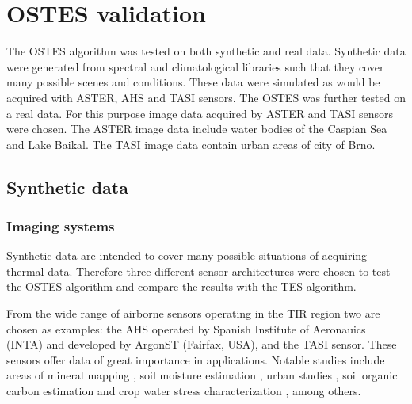\chapter{OSTES validation}
\label{chap:OSTESValid}

The OSTES algorithm was tested on both synthetic and real data. Synthetic data were generated from spectral and climatological  libraries such that they cover many possible scenes and conditions. These data were simulated as would be acquired with ASTER, AHS and TASI sensors. The OSTES was further tested on a real data. For this purpose image data acquired by ASTER and TASI sensors were chosen. The ASTER image data include water bodies of the Caspian Sea and Lake Baikal. The TASI image data contain urban areas of city of Brno. 

\section{Synthetic data}

\subsection*{Imaging systems}

Synthetic data are intended to cover many possible situations of acquiring thermal data. Therefore three different sensor architectures were chosen to test the OSTES algorithm and compare the results with the TES algorithm.

From the wide range of airborne sensors operating in the TIR region two are chosen as examples: the AHS operated by Spanish Institute of Aeronauics (INTA) and developed by ArgonST (Fairfax, USA), and the TASI sensor. These sensors offer data of great importance in applications. Notable studies include areas of
mineral mapping \cite{NK14}, 
soil moisture estimation \cite{SF12}, 
urban studies \cite{SO12},
soil organic carbon estimation \cite{PC14} and
crop water stress characterization \cite{PP12},
among others.

